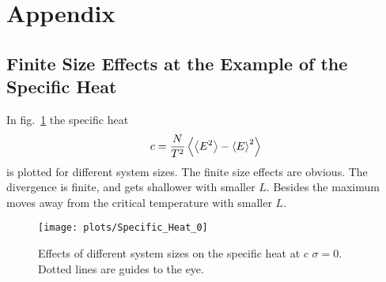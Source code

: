 \section{Appendix}
\subsection{Finite Size Effects at the Example of the Specific Heat}
\label{appendix:finiteSizeEffects}
    In fig.\ \ref{fig:smeared_out_appendix} the specific heat
    \begin{equation}
        c = \frac{N}{T^2}\left< \left< E^2 \right> - \left< E \right>^2 \right>
    \end{equation}
    is plotted for different system sizes. The finite size effects are obvious.
    The divergence is finite, and gets shallower with smaller \(L\). Besides
    the maximum moves away from the critical temperature with smaller \(L\).
    \begin{figure}[htbp]
        \centering
        \texttt{[image: plots/Specific\_Heat\_0]}
        \caption[Finite Size Effects by Example of the Specific Heat]
        {
            Effects of different system sizes on the specific heat at \(c\)
            \(\sigma = 0\). Dotted lines are guides to the eye.
        }
        \label{fig:smeared_out_appendix}
    \end{figure}

